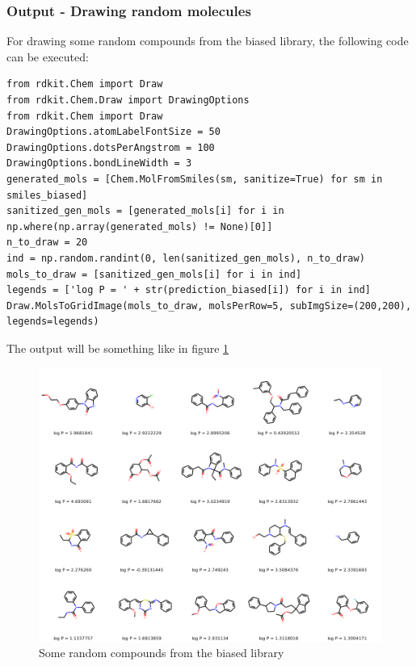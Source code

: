\documentclass[a4paper]{article}
\begin{document}
\subsubsection{Output - Drawing random molecules}\label{sec:Output - Drawing random molecules}

For drawing some random compounds from the biased library, the following code can be executed:

\begin{lstlisting}
from rdkit.Chem import Draw
from rdkit.Chem.Draw import DrawingOptions
from rdkit.Chem import Draw
DrawingOptions.atomLabelFontSize = 50
DrawingOptions.dotsPerAngstrom = 100
DrawingOptions.bondLineWidth = 3
generated_mols = [Chem.MolFromSmiles(sm, sanitize=True) for sm in smiles_biased]
sanitized_gen_mols = [generated_mols[i] for i in np.where(np.array(generated_mols) != None)[0]]
n_to_draw = 20
ind = np.random.randint(0, len(sanitized_gen_mols), n_to_draw)
mols_to_draw = [sanitized_gen_mols[i] for i in ind]
legends = ['log P = ' + str(prediction_biased[i]) for i in ind]
Draw.MolsToGridImage(mols_to_draw, molsPerRow=5, subImgSize=(200,200), legends=legends)
\end{lstlisting}

The output will be something like in figure \ref{fig:output}

\begin{figure}[htbp]
	\centering
			\includegraphics[width=\textwidth]{output.png}
	\caption{Some random compounds from the biased library}
	\label{fig:output}
\end{figure}
\end{document}
